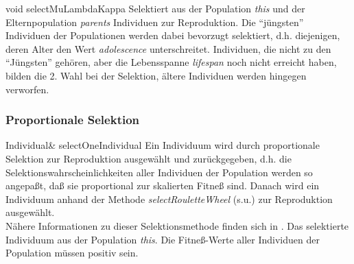 \documentclass{report}
\begin{document}
\newpage

\setNormalInstance
\setCorrectWidthThree{8pt}
\printMethodWithParamsSaved
{void}
{}
{selectMuLambdaKappa}
{Selektiert aus der Population {\em this} und der Elternpopulation 
 {\em parents} Individuen zur Reproduktion. Die ``j\"ungsten''
 Individuen der Populationen werden dabei bevorzugt selektiert, d.h.
 diejenigen, deren Alter den Wert {\em adolescence} unterschreitet.
 Individuen, die nicht zu den ``J\"ungsten'' geh\"oren, aber die 
 Lebensspanne {\em lifespan} noch nicht erreicht haben, bilden die 
 2. Wahl bei der Selektion, \"altere Individuen werden hingegen 
 verworfen.}
{}
\setCorrectWidthThree{4pt}

\subsubsection{Proportionale Selektion}

\setNormalInstance
\printEmptyMethodReturnSpecial
{Individual\&}
{selectOneIndividual}
{Ein Individuum wird durch proportionale Selektion
 zur Reproduktion ausgew\"ahlt und zur\"uckgegeben, d.h. die
 Selektionswahrscheinlichkeiten aller Individuen der Population
 werden so angepa{\ss}t, da{\ss} sie proportional zur skalierten
 Fitne{\ss} sind. Danach wird ein Individuum anhand der
 Methode {\em selectRouletteWheel} (s.u.) zur Reproduktion ausgew\"ahlt.\\
 N\"ahere Informationen zu dieser Selektionsmethode finden sich
 in \cite{EALib}.}
{Das selektierte Individuum aus der Population {\em this}.}
{Die Fitne{\ss}-Werte aller Individuen der Population m\"ussen positiv sein.}

\newpage
\end{document}
